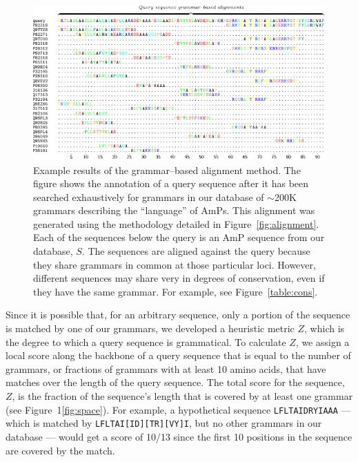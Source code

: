         \begin{figure}
        \centering
        \includegraphics[width=\textheight]{Body/Images-chap2/amp-align.pdf}
        \caption[Example results of the grammar--based alignment method]{
            Example results of the grammar--based alignment method.
            The figure shows the annotation of a query sequence
            after it has been searched exhaustively for grammars in
            our database of $\sim$200K grammars describing the
            ``language'' of AmPs.  This alignment was generated
            using the methodology detailed in
            Figure~\vref{fig:alignment}.  Each of the sequences
            below the query is an AmP sequence from our database,
            $S$.  The sequences are aligned against the query
            because they share grammars in common at those
            particular loci.  However, different sequences may share
            very in degrees of conservation, even if they have the
            same grammar.  For example, see Figure~\vref{table:cons}.
        }
        \label{fig:ampAlign}
        \end{figure}

        

    Since it is possible that, for an arbitrary sequence, only a portion
    of the sequence is matched by one of our grammars, we developed a
    heuristic metric $Z$, which is the degree to which a query sequence
    is grammatical.  To calculate $Z$, we assign a local score along the
    backbone of a query sequence that is equal to the number of grammars,
    or fractions of grammars with at least 10 amino acids, that have
    matches over the length of the query sequence.  The total score for
    the sequence, $Z$, is the fraction of the sequence's length that
    is covered by at least one grammar (see Figure~1\ref{fig:space}).
    For example, a hypothetical sequence \texttt{LFLTAIDRYIAAA} ---
    which is matched by \texttt{LFLTAI[ID][TR][VY]I}, but no other
    grammars in our database --- would get a score of 10/13 since the
    first 10 positions in the sequence are covered by the match.

